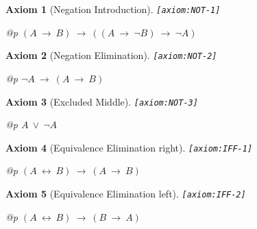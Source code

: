 \documentclass[a4paper,german,10pt,twoside]{book}
\newtheorem{ax}{Axiom}
\theoremstyle{definition}
\theoremstyle{remark}
\begin{document}
\begin{ax}[Negation Introduction]
\label{axiom:NOT-1} \hypertarget{axiom:NOT-1}{}
{\tt \tiny [\verb]axiom:NOT-1]]}
\mbox{}
\begin{longtable}{{@{\extracolsep{\fill}}p{\linewidth}}}
\centering $(A\ \rightarrow\ B)\ \rightarrow\ ((A\ \rightarrow\ \neg B)\ \rightarrow\ \neg A)$
\end{longtable}

\end{ax}


\begin{ax}[Negation Elimination]
\label{axiom:NOT-2} \hypertarget{axiom:NOT-2}{}
{\tt \tiny [\verb]axiom:NOT-2]]}
\mbox{}
\begin{longtable}{{@{\extracolsep{\fill}}p{\linewidth}}}
\centering $\neg A\ \rightarrow\ (A\ \rightarrow\ B)$
\end{longtable}

\end{ax}


\begin{ax}[Excluded Middle]
\label{axiom:NOT-3} \hypertarget{axiom:NOT-3}{}
{\tt \tiny [\verb]axiom:NOT-3]]}
\mbox{}
\begin{longtable}{{@{\extracolsep{\fill}}p{\linewidth}}}
\centering $A\ \lor\ \neg A$
\end{longtable}

\end{ax}


\begin{ax}[Equivalence Elimination right]
\label{axiom:IFF-1} \hypertarget{axiom:IFF-1}{}
{\tt \tiny [\verb]axiom:IFF-1]]}
\mbox{}
\begin{longtable}{{@{\extracolsep{\fill}}p{\linewidth}}}
\centering $(A\ \leftrightarrow\ B)\ \rightarrow\ (A\ \rightarrow\ B)$
\end{longtable}

\end{ax}


\begin{ax}[Equivalence Elimination left]
\label{axiom:IFF-2} \hypertarget{axiom:IFF-2}{}
{\tt \tiny [\verb]axiom:IFF-2]]}
\mbox{}
\begin{longtable}{{@{\extracolsep{\fill}}p{\linewidth}}}
\centering $(A\ \leftrightarrow\ B)\ \rightarrow\ (B\ \rightarrow\ A)$
\end{longtable}

\end{ax}
\end{document}
